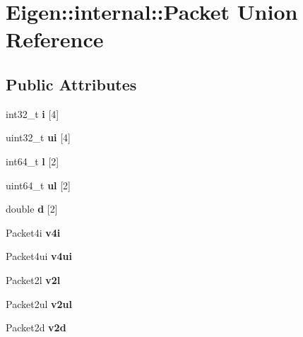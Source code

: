 \hypertarget{union_eigen_1_1internal_1_1_packet}{}\section{Eigen\+:\+:internal\+:\+:Packet Union Reference}
\label{union_eigen_1_1internal_1_1_packet}
\subsection*{Public Attributes}
\begin{DoxyCompactItemize}
\item 
\mbox{\label{union_eigen_1_1internal_1_1_packet_a2a06ebbbbd2240d9abafe29152fe7528}} 
int32\+\_\+t {\bfseries i} \mbox{[}4\mbox{]}
\item 
\mbox{\label{union_eigen_1_1internal_1_1_packet_a0c786ad0043edb2892d03483569d7a13}} 
uint32\+\_\+t {\bfseries ui} \mbox{[}4\mbox{]}
\item 
\mbox{\label{union_eigen_1_1internal_1_1_packet_ad85aafdbd1e6cfcfcd8de0f3a31506c8}} 
int64\+\_\+t {\bfseries l} \mbox{[}2\mbox{]}
\item 
\mbox{\label{union_eigen_1_1internal_1_1_packet_a5195edb66e4db95c0fc6582f9e53676b}} 
uint64\+\_\+t {\bfseries ul} \mbox{[}2\mbox{]}
\item 
\mbox{\label{union_eigen_1_1internal_1_1_packet_a250fcbc5e88c1472fd59fa96ff82d848}} 
double {\bfseries d} \mbox{[}2\mbox{]}
\item 
\mbox{\label{union_eigen_1_1internal_1_1_packet_a80c11722980f20f903a873831f4f11e5}} 
Packet4i {\bfseries v4i}
\item 
\mbox{\label{union_eigen_1_1internal_1_1_packet_ab725695337c5673ab0eea5fe958e1948}} 
Packet4ui {\bfseries v4ui}
\item 
\mbox{\label{union_eigen_1_1internal_1_1_packet_ac12660f5bd77d2906e0e2ac8464877dd}} 
Packet2l {\bfseries v2l}
\item 
\mbox{\label{union_eigen_1_1internal_1_1_packet_a392b94f62f7d878ce68cca757a6d8d0c}} 
Packet2ul {\bfseries v2ul}
\item 
\mbox{\label{union_eigen_1_1internal_1_1_packet_af5ca72a89eda67aedb62d67efed0835e}} 
Packet2d {\bfseries v2d}
\end{DoxyCompactItemize}


